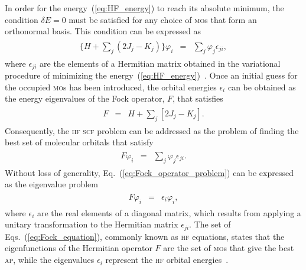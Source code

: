In order for the energy~(\ref{eq:HF_energy}) to reach its absolute
minimum, the condition $\delta E = 0$ must be satisfied for any choice
of \textsc{mo}s that form an orthonormal basis. This condition can be
expressed as~\cite{Roothaan_HF,Levine_QChem}
%
\begin{eqnarray}
  \begin{split}
    \{H + \sum\limits_{j} ( 2J_{j} - K_{j} ) \} \varphi_{i} & = &
    \sum\limits_{j} \varphi_{j} \epsilon_{ji},
  \end{split}
\label{eq:deltaEzero}
\end{eqnarray}
%
where $\epsilon_{ji}$ are the elements of a Hermitian matrix obtained
in the variational procedure of minimizing the
energy~(\ref{eq:HF_energy})~\cite{Roothaan_HF}. Once an initial guess
for the occupied \textsc{mo}s has been introduced, the orbital
energies $\epsilon_{i}$ can be obtained as the energy eigenvalues of
the Fock operator, $F$, that satisfies
%
\begin{eqnarray}
  \begin{split}
    F & = & H +
    \sum\limits_{j} [ 2 J_{j} - K_{j} ].
  \end{split}
  \label{eq:F_operator}
\end{eqnarray}
%
Consequently, the \textsc{hf} \textsc{scf} problem can be addressed as
the problem of finding the best set of molecular orbitals that
satisfy~\cite{Roothaan_HF,Levine_QChem}
%
\begin{eqnarray}
  \begin{split}
    F \varphi_{i} & = & \sum\limits_{j} \varphi_{j} \epsilon_{ji}.
  \end{split}
  \label{eq:Fock_operator_problem}
\end{eqnarray}
%
Without loss of generality, Eq.~(\ref{eq:Fock_operator_problem}) can
be expressed as the eigenvalue problem
%
\begin{eqnarray}
  \begin{split}
    F \varphi_{i} & = & \epsilon_{i} \varphi_{i},
  \end{split}
  \label{eq:Fock_equation}
\end{eqnarray}
%
where $\epsilon_{i}$ are the real elements of a diagonal matrix, which
results from applying a unitary transformation to the Hermitian matrix
$\epsilon_{ji}$. The set of Eqs.~(\ref{eq:Fock_equation}), commonly
known as \textsc{hf} equations, states that the eigenfunctions of the
Hermitian operator $F$ are the set of \textsc{mo}s that give the best
\textsc{ap}, while the eigenvalues $\epsilon_{i}$ represent the
\textsc{hf} orbital energies~\cite{Roothaan_HF}.

